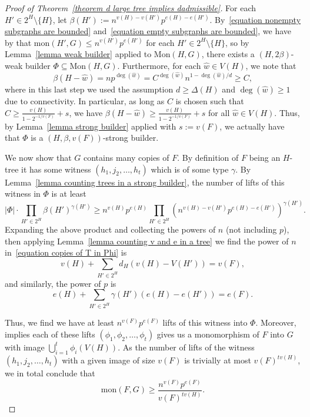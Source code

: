 \documentclass[12pt,letterpaper]{article}
\theoremstyle{definition}
\newcommand{\mon}{\mathrm{mon}}
\newcommand{\Mon}{\mathrm{Mon}}
\begin{document}
\begin{proof}[Proof of Theorem~\ref{theorem d large tree implies dadmissible}]
		For each $H'\in 2^H\setminus\{H\}$, let $\beta(H'):=n^{v(H)-v(H')}p^{e(H)-e(H')}$. By~\eqref{equation nonempty subgraphs are bounded} and~\eqref{equation empty subgraphs are bounded}, we have by  that $\mon(H',G)\le  n^{v(H')}p^{e(H')}$ for each $H'\in 2^H\setminus\{H\}$, so by Lemma~\ref{lemma weak builder} applied to $\Mon(H,G)$, there exists a $(H,2\beta)$-weak builder $\Phi\subseteq \mathrm{Mon}(H,G)$. Furthermore, for each $\hat{w}\in V(H)$, we note that
		\[
		\beta(H-\hat{w})=np^{\deg(\hat{w})}=C^{\deg(\hat{w})}n^{1-\deg(\hat{w})/d}\geq C,
		\]
		where in this last step we used the assumption $d\ge \Delta(H)$ and $\deg(\hat{w})\ge 1$ due to connectivity. In particular, as long as $C$ is chosen such that $C\geq \frac{v(H)}{1-2^{-1/v(F)}}+s$, we have $\beta(H-\hat{w})\geq \frac{v(H)}{1-2^{-1/v(F)}}+s$ for all $\hat{w}\in V(H)$. Thus, by Lemma~\ref{lemma strong builder} applied with $s:=v(F)$, we actually have that $\Phi$ is a $(H,\beta,v(F))$-strong builder.
		
		
		We now show that $G$ contains many copies of $F$.  By definition of $F$ being an $H$-tree it has some witness $(h_1,j_2,\ldots,h_t)$ which is of some type $\gamma$.  By Lemma~\ref{lemma counting trees in a strong builder},  the number of lifts of this witness in $\Phi$ is at least 
		\begin{equation}\label{equation copies of T in Phi}
			|\Phi|\cdot\prod_{H'\in 2^H} \beta(H')^{\gamma(H')}\geq n^{v(H)}p^{e(H)}\prod_{H'\in 2^H} \left(n^{v(H)-v(H')}p^{e(H)-e(H')}\right)^{\gamma(H')}.
		\end{equation}
		Expanding the above product and collecting the powers of $n$ (not including $p$), then applying Lemma~\ref{lemma counting v and e in a tree} we find the power of $n$ in~\eqref{equation copies of T in Phi} is
		\[
		v(H)+\sum_{H'\in 2^H}d_H(v(H)-V(H'))=v(F),
		\]
		and similarly, the power of $p$ is
		\[
		e(H)+\sum_{H'\in 2^H}\gamma(H')(e(H)-e(H'))=e(F).
		\]
		
		Thus, we find we have at least $n^{v(F)}p^{e(F)}$ lifts of this witness into $\Phi$.  Moreover,  implies each of these lifts $(\phi_1,\phi_2,\dots,\phi_t)$ gives us a monomorphism of $F$ into $G$ with image $\bigcup_{i=1}^t\phi_i(V(H))$.  As the number of lifts of the witness $(h_1,j_2,\ldots,h_t)$ with a given image of size $v(F)$ is trivially at most $v(F)^{tv(H)}$, we in total conclude that
		\[
		\mon(F,G)\geq \frac{n^{v(F)}p^{e(F)}}{v(F)^{tv(H)}}.
		\]
		

\end{proof}
\end{document}
